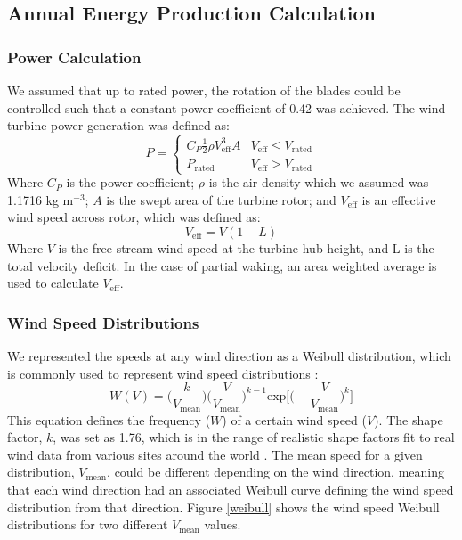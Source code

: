 \documentclass[WESD, manuscript]{copernicus}
\begin{document}
	\subsection{Annual Energy Production Calculation}
	\subsubsection{Power Calculation}
We assumed that up to rated power, the rotation of the blades could be controlled such that a constant power coefficient of 0.42 was achieved. The wind turbine power generation was defined as:
\begin{equation}
P = 
\begin{cases} 
      C_P\frac{1}{2}\rho V_{\text{eff}}^3A & V_{\text{eff}}\leq V_{\text{rated}} \\
      P_{\text{rated}} & V_{\text{eff}} > V_{\text{rated}}
   \end{cases}
\end{equation}
\noindent Where $C_P$ is the power coefficient; $\rho$ is the air density which we assumed was 1.1716 kg m$^{-3}$; $A$ is the swept area of the turbine rotor; and $V_{\text{eff}}$ is an effective wind speed across rotor, which was defined as:
\begin{equation}
V_{\text{eff}} = V(1-L)
\end{equation}
\noindent Where $V$ is the free stream wind speed at the turbine hub height, and L is the total velocity deficit. In the case of partial waking, an area weighted average is used to calculate $V_{\text{eff}}$.


\subsubsection{Wind Speed Distributions}

We represented the speeds at any wind direction as a Weibull distribution, which is commonly used to represent wind speed distributions \citep{justus1978methods,rehman1994weibull,dorvlo2002estimating}: 
\begin{equation}
W(V) = \Big(\frac{k}{V_{\text{mean}}}\Big)\Big(\frac{V}{V_{\text{mean}}}\Big)^{k-1}\text{exp}\Big[\Big(-\frac{V}{V_{\text{mean}}}\Big)^k\Big]
\end{equation}
This equation defines the frequency ($W$) of a certain wind speed ($V$).
The shape factor, $k$, was set as 1.76, which is in the range of realistic shape factors fit to real wind data from various sites around the world \citep{garcia1998fitting,lun2000study}. 
The mean speed for a given distribution, $V_{\text{mean}}$, could be different depending on the wind direction, meaning that each wind direction had an associated Weibull curve defining the wind speed distribution from that direction. 
Figure \ref{weibull} shows the wind speed Weibull distributions for two different $V_{\text{mean}}$ values. 
\end{document}

